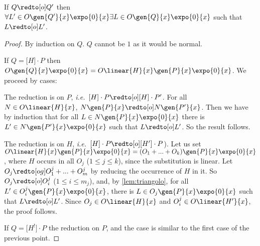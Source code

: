 \begin{lemma} \label{lem:quadrato}
If $Q \redto[o]  Q'$ then
$\forall L' \in O\gen{Q'}{x} \expo{0}{x}
\exists L \in O\gen{Q}{x} \expo{0}{x}$
such that $L \redto[o] L'$.
\end{lemma}

\begin{proof}
By induction on $Q$. $Q$ cannot be $1$ as it would be normal.

If $Q=\lbrack H \rbrack \cdot P$ then
$O \gen{Q}{x} \expo{0}{x} =
O \linear{H}{x} \gen{P}{x} \expo{0}{x}$.
We proceed by cases:
\begin{enumcases}
\item The reduction is on $P$, \emph{i.e.}\ $ [H] \cdot P \redto[o] [H] \cdot P' $.
For all $N \in O \linear{H}{x}$, $N\gen{P}{x} \redto[o]N\gen{P'}{x}$. Then we have by induction that
for all $L \in N\gen{P}{x} \expo{0}{x}$ there is $L' \in N \gen{P'}{x} \expo{0}{x}$ such that $L \redto[o] L'$.
So the result follows.

\item The reduction is on $H$, \emph{i.e.}\ $ [H] \cdot P \redto[o] [H'] \cdot P $).
Let us set $
O\linear{H}{x}\gen{P}{x}\expo{0}{x} =
(O_1 + ... + O_k) \gen{P}{x}\expo{0}{x}$,
where $H$ occurs in all $O_{j}$ ($1 \leq j \leq k$), since the substitution is linear.
Let $O_{j} \redto[og] O^{j}_{1}+...+O^{j}_{m}$ by reducing the occurrence of $H$ in it.
So $O_{j} \redto[o] O^{j}_{i}$ ($1 \leq i \leq m_{j}$), and, by \autoref{lem:triangolo},
for all $L' \in O^{j}_{i} \gen{P}{x} \expo{0}{x}$, there is $L\in O_{j}\gen{P}{x} \expo{0}{x}$
such that $L\redto[o] L' $. Since $O_{j}\in O\linear{H}{x}$ and $O^{j}_{i}\in O\linear{H'}{x}$, the proof follows.\
\end{enumcases}

If $Q= \lbrack H^! \rbrack \cdot P$
the reduction on $P$, and the case is similar to the first case of the previous point.\qedhere





\end{proof}

